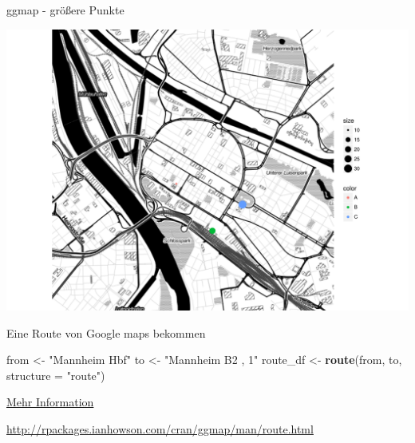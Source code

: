 \documentclass[ignorenonframetext,]{beamer}
\newenvironment{Shaded}{}{}
\newcommand{\KeywordTok}[1]{\textcolor[rgb]{0.00,0.44,0.13}{\textbf{{#1}}}}
\newcommand{\DataTypeTok}[1]{\textcolor[rgb]{0.56,0.13,0.00}{{#1}}}
\newcommand{\DecValTok}[1]{\textcolor[rgb]{0.25,0.63,0.44}{{#1}}}
\newcommand{\StringTok}[1]{\textcolor[rgb]{0.25,0.44,0.63}{{#1}}}
\newcommand{\NormalTok}[1]{{#1}}
\begin{document}
\begin{frame}[fragile]{ggmap - größere Punkte}

\begin{Shaded}
\end{Shaded}

\includegraphics{R_intern_files/figure-beamer/unnamed-chunk-288-1.pdf}

\end{frame}

\begin{frame}[fragile]{Eine Route von Google maps bekommen}

\begin{Shaded}
\begin{Highlighting}[]
\NormalTok{from <-}\StringTok{ "Mannheim Hbf"}
\NormalTok{to <-}\StringTok{ "Mannheim B2 , 1"}
\NormalTok{route_df <-}\StringTok{ }\KeywordTok{route}\NormalTok{(from, to, }\DataTypeTok{structure =} \StringTok{"route"}\NormalTok{)}
\end{Highlighting}
\end{Shaded}

\href{http://rpackages.ianhowson.com/cran/ggmap/man/route.html}{Mehr
Information}

\url{http://rpackages.ianhowson.com/cran/ggmap/man/route.html}

\end{frame}
\end{document}
